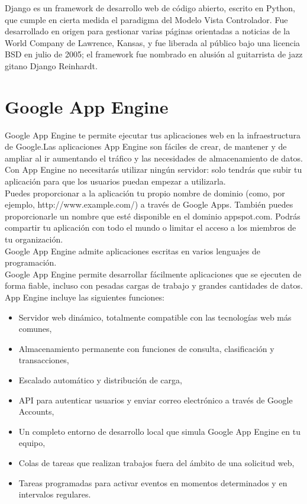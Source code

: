 Django es un framework de desarrollo web de código abierto, escrito en Python, que cumple en cierta medida el paradigma del Modelo Vista Controlador. 
Fue desarrollado en origen para gestionar varias páginas orientadas a noticias de la World Company de Lawrence, Kansas, 
y fue liberada al público bajo una licencia BSD en julio de 2005; el framework fue nombrado en alusión al guitarrista de jazz gitano Django Reinhardt.

\section{Google App Engine}
\label{2:sec3}

Google App Engine te permite ejecutar tus aplicaciones web en la infraestructura de Google.Las 
aplicaciones App Engine son fáciles de crear, de mantener y de ampliar al ir aumentando el tráfico 
y las necesidades de almacenamiento de datos. Con App Engine no necesitarás utilizar ningún servidor: 
solo tendrás que subir tu aplicación para que los usuarios puedan empezar a utilizarla.\\

Puedes proporcionar a la aplicación tu propio nombre de dominio (como, por ejemplo, http://www.example.com/) 
a través de Google Apps. También puedes proporcionarle un nombre que esté disponible en el dominio appspot.com. 
Podrás compartir tu aplicación con todo el mundo o limitar el acceso a los miembros de tu organización.\\


Google App Engine admite aplicaciones escritas en varios lenguajes de programación.\\


Google App Engine permite desarrollar fácilmente aplicaciones que se ejecuten de forma fiable, 
incluso con pesadas cargas de trabajo y grandes cantidades de datos. App Engine incluye las siguientes funciones:

\begin{itemize}
  \item Servidor web dinámico, totalmente compatible con las tecnologías web más comunes,
  \item Almacenamiento permanente con funciones de consulta, clasificación y transacciones,
  \item Escalado automático y distribución de carga,
  \item API para autenticar usuarios y enviar correo electrónico a través de Google Accounts,
  \item Un completo entorno de desarrollo local que simula Google App Engine en tu equipo,
  \item Colas de tareas que realizan trabajos fuera del ámbito de una solicitud web,
  \item Tareas programadas para activar eventos en momentos determinados y en intervalos regulares.
\end{itemize}

